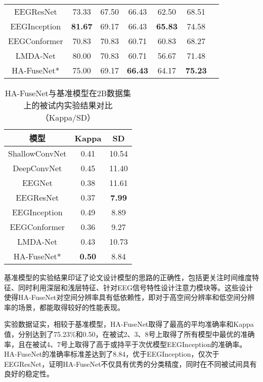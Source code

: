 \begin{table}[ht]
\begin{subtable}[ht]{\textwidth}
\begin{tabularx}{\textwidth}{CCCCCCC}
        EEGResNet\cite{HBM:HBM23730}  & 73.33 & 67.50 & 66.43 & 62.50 & 68.51\\
        EEGInception\cite{zhang2021eeg}  & \textbf{81.67} & 69.17 & 66.43 & \textbf{65.83} & 74.58 \\
        EEGConformer\cite{song2022eeg}  & 70.83 & 70.83 & 60.71 & 60.83 & 68.27\\
        LMDA-Net\cite{miao2023lmda}  & 80.00 & 70.83 & 60.71 & 56.67 & 71.48 \\
        HA-FuseNet*   & 75.00 & 69.17 & \textbf{66.43} & 64.17 & \textbf{75.23} \\
        \bottomrule
      \end{tabularx}
    \end{subtable}
\end{table}
\begin{table}[H]
    \centering
    \caption{HA-FuseNet与基准模型在2B数据集上的被试内实验结果对比（Kappa/SD）}
    \label{tab:2bcompareinsd}
    \begin{tabularx}{\textwidth}{CCC}
      \toprule
      模型 & Kappa & SD \\
      \midrule
      ShallowConvNet\cite{schirrmeister2017deep} &0.41&10.54\\
      DeepConvNet\cite{schirrmeister2017deep} &0.45&11.40\\
      EEGNet\cite{lawhern2018eegnet} &0.38& 11.61\\
      EEGResNet\cite{HBM:HBM23730} &0.37&\textbf{7.99}\\
      EEGInception\cite{zhang2021eeg} &0.49&8.89\\
      EEGConformer\cite{song2022eeg} &0.36&9.27\\
      LMDA-Net\cite{miao2023lmda} &0.43&10.73\\
      HA-FuseNet* &\textbf{0.50}&8.84\\
      \bottomrule
    \end{tabularx}
\end{table}

基准模型的实验结果印证了论文设计模型的思路的正确性，包括更关注时间维度特征、同时利用深层和浅层特征、针对EEG信号特性设计注意力模块等。这些设计使得HA-FuseNet对空间分辨率具有低依赖性，即对于高空间分辨率和低空间分辨率的场景，都能取得较好的性能表现。

实验数据证实，相较于基准模型，HA-FuseNet取得了最高的平均准确率和Kappa值，分别达到了75.23\%和0.50，在被试2、3、8号上取得了所有模型中最优的准确率，且在被试4、7号上取得了高于或持平于次优模型EEGInception的准确率。HA-FuseNet的准确率标准差达到了8.84，优于EEGInception，仅次于EEGResNet，证明HA-FuseNet不仅具有优秀的分类精度，同时在不同被试间具有良好的稳定性。

